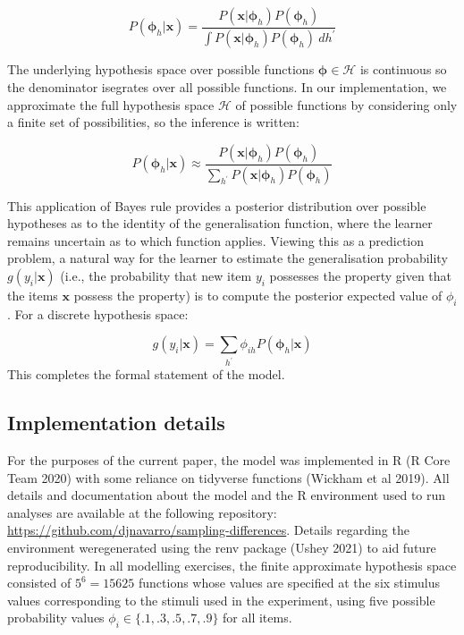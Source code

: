 \documentclass[
  english,
  doc]{apa6}
\begin{document}
\[ 
P({\bm \phi}_h | \bm x) = \frac{P(\bm x | \bm{\phi}_h) P(\bm{\phi}_h)}{\int P(\bm x | \bm{\phi}_h) P(\bm{\phi}_h) \ dh^\prime}
\]

\noindent
The underlying hypothesis space over possible functions \(\bm \phi \in \mathcal H\) is continuous so the denominator isegrates over all possible functions. In our implementation, we approximate the full hypothesis space \(\mathcal{H}\) of possible functions by considering only a finite set of possibilities, so the inference is written:

\[ 
P({\bm \phi}_h | \bm x) \approx \frac{P(\bm x | \bm{\phi}_h) P(\bm{\phi}_h)}{\sum_{h^\prime} P(\bm x | \bm{\phi}_h) P(\bm{\phi}_h)}
\]

\noindent
This application of Bayes rule provides a posterior distribution over possible hypotheses as to the identity of the generalisation function, where the learner remains uncertain as to which function applies. Viewing this as a prediction problem, a natural way for the learner to estimate the generalisation probability \(g(y_i | \bm{x})\) (i.e., the probability that new item \(y_i\) possesses the property given that the items \(\bm x\) possess the property) is to compute the posterior expected value of \(\phi_i\). For a discrete hypothesis space:

\[
g(y_i | \bm{x}) = \sum_{h^\prime} \phi_{ih} P({\bm \phi}_h | \bm x)
\]
This completes the formal statement of the model.

\hypertarget{implementation-details}{%
\subsection{Implementation details}\label{implementation-details}}

\noindent
For the purposes of the current paper, the model was implemented in R (R Core Team 2020) with some reliance on tidyverse functions (Wickham et al 2019). All details and documentation about the model and the R environment used to run analyses are available at the following repository: \url{https://github.com/djnavarro/sampling-differences}. Details regarding the environment weregenerated using the renv package (Ushey 2021) to aid future reproducibility. In all modelling exercises, the finite approximate hypothesis space consisted of \(5^6 = 15625\) functions whose values are specified at the six stimulus values corresponding to the stimuli used in the experiment, using five possible probability values \(\phi_i \in \{.1, .3, .5, .7, .9\}\) for all items.
\end{document}
